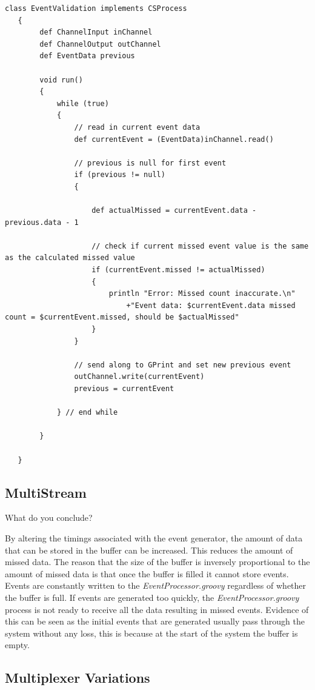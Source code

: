 \documentclass[10pt, a4paper]{article}
\begin{document}
   \begin{lstlisting}[caption = "EventValidation.groovy" \label{lst:event}]
   class EventValidation implements CSProcess
   {
   	  	def ChannelInput inChannel
      	def ChannelOutput outChannel
      	def EventData previous
   
   	  	void run()
   	  	{
   	    	while (true)
   		 	{
   				// read in current event data
 				def currentEvent = (EventData)inChannel.read()
   
   				// previous is null for first event
   				if (previous != null)
   	 			{
   
   		 			def actualMissed = currentEvent.data - previous.data - 1
   
   					// check if current missed event value is the same as the calculated missed value
	   				if (currentEvent.missed != actualMissed)
   					{
   						println "Error: Missed count inaccurate.\n"
   							+"Event data: $currentEvent.data missed count = $currentEvent.missed, should be $actualMissed"
   					}
   				}
   
   				// send along to GPrint and set new previous event
   				outChannel.write(currentEvent)
   				previous = currentEvent	
   								
  			} // end while
   
   		}
   
   }   \end{lstlisting}
   \subsection{MultiStream}

   What do you conclude?
   
   By altering the timings associated with the event generator, the amount of data that can be stored in the buffer can be increased. This reduces the amount of missed data. The reason that the size of the buffer is inversely proportional to the amount of missed data is that once the buffer is filled it cannot store events. Events are constantly written to the \textit{EventProcessor.groovy} regardless of whether the buffer is full. If events are generated too quickly, the  \textit{EventProcessor.groovy} process is not ready to receive all the data resulting in missed events. Evidence of this can be seen as the initial events that are generated usually pass through the system without any loss, this is because at the start of the system the buffer is empty. 
   
   
   \subsection{Multiplexer Variations}
   
\end{document}
